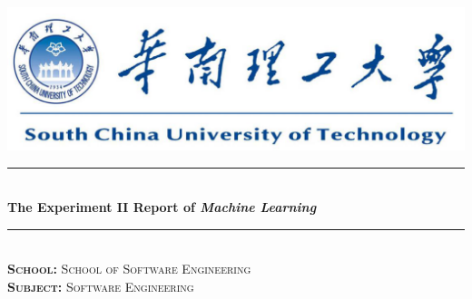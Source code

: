 \documentclass[journal, a4paper]{IEEEtran}
\begin{document}
\begin{titlepage}

\newcommand{\HRule}{\rule{\linewidth}{0.5mm}} %

\center %

~\\[1cm]
\includegraphics{SCUT.png}\\[2cm] %


\HRule \\[1cm]
{ \huge \bfseries The Experiment II Report of \textit{Machine Learning} }\\[0.6cm] %
\HRule \\[2cm]


\textsc{\LARGE \textbf{School:} School of Software Engineering}\\[1cm]
\textsc{\LARGE \textbf{Subject:} Software Engineering}\\[2cm] 

 


\end{titlepage}
\end{document}
